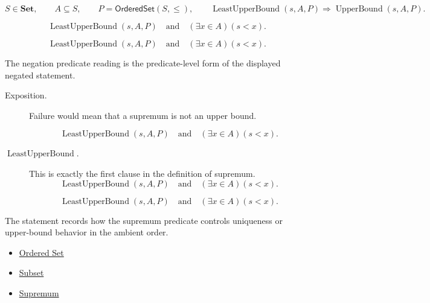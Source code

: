 \begin{remark*}
\[
  S\in\mathbf{Set},\qquad A\subseteq S,\qquad P=\mathsf{OrderedSet}(S,\leq),\qquad
  \operatorname{LeastUpperBound}(s,A,P)\Longrightarrow
  \operatorname{UpperBound}(s,A,P).
\]
\end{remark*}

\begin{remark*}
\[
  \operatorname{LeastUpperBound}(s,A,P)
  \quad\text{and}\quad
  (\exists x\in A)(s<x).
\]
\end{remark*}

\begin{remark*}
\[
  \operatorname{LeastUpperBound}(s,A,P)
  \quad\text{and}\quad
  (\exists x\in A)(s<x).
\]

The negation predicate reading is the predicate-level form of the displayed negated statement.
\end{remark*}

\begin{remark*}
\begin{description}
  \item[Exposition.]
  Failure would mean that a supremum is not an upper bound.

  
\[
\operatorname{LeastUpperBound}(s,A,P)
  \quad\text{and}\quad
  (\exists x\in A)(s<x).
\]
  \item[\(\operatorname{LeastUpperBound}.\)]
  This is exactly the first clause in the definition of supremum.
  \[
    \operatorname{LeastUpperBound}(s,A,P)
    \quad\text{and}\quad
    (\exists x\in A)(s<x).
  \]

\[
    \operatorname{LeastUpperBound}(s,A,P)
    \quad\text{and}\quad
    (\exists x\in A)(s<x).
  \]
\end{description}
\end{remark*}

\begin{remark*}[Interpretation]
The statement records how the supremum predicate controls uniqueness or upper-bound behavior in the ambient order.
\end{remark*}

\begin{dependencies}
\begin{itemize}
  \item \hyperref[def:ordered-set]{Ordered Set}
  \item \hyperref[def:subset]{Subset}
  \item \hyperref[def:supremum]{Supremum}
\end{itemize}
\end{dependencies}

